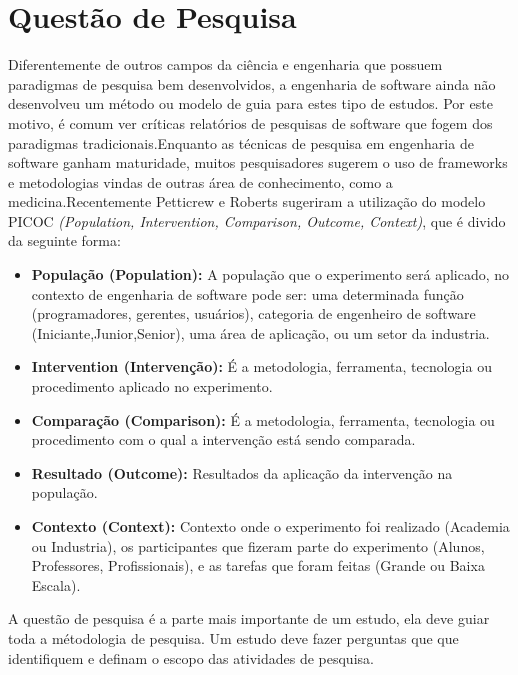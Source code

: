\section{Questão de Pesquisa}

Diferentemente de outros campos da ciência e engenharia que possuem paradigmas de 
pesquisa bem desenvolvidos, a engenharia de software ainda não desenvolveu um
método ou modelo de guia para estes tipo de estudos. Por este motivo, é
comum ver críticas relatórios de pesquisas de software que fogem dos paradigmas
tradicionais\cite{shaw}.Enquanto as técnicas de pesquisa em engenharia de software
ganham maturidade, muitos pesquisadores sugerem o uso de frameworks e metodologias
vindas de outras área de conhecimento, como a medicina\cite{guidelines}.Recentemente 
Petticrew e Roberts sugeriram a utilização do modelo PICOC \textit{(Population,
Intervention, Comparison, Outcome, Context)}, que é divido da seguinte forma\cite{petticrew}:

\begin{itemize}
    \item \textbf{População (Population):} A população que o experimento será 
        aplicado, no contexto de engenharia de software pode ser: uma determinada
        função (programadores, gerentes, usuários), categoria de engenheiro de 
        software (Iniciante,Junior,Senior), uma área de aplicação, ou um setor 
        da industria.
    \item \textbf{Intervention (Intervenção):} É a metodologia, ferramenta,
        tecnologia ou procedimento aplicado no experimento.
    \item \textbf{Comparação (Comparison):} É a metodologia, ferramenta,
        tecnologia ou procedimento com o qual a intervenção está sendo comparada.
    \item \textbf{Resultado  (Outcome):} Resultados da aplicação da intervenção na
        população.
    \item \textbf{Contexto (Context):} Contexto onde o experimento foi realizado
        (Academia ou Industria), os participantes que fizeram parte do experimento
        (Alunos, Professores, Profissionais), e as tarefas que foram feitas
        (Grande ou Baixa Escala).
\end{itemize}

A questão de pesquisa é a parte mais importante de um estudo, ela deve guiar toda
a métodologia de pesquisa. Um estudo deve fazer perguntas que que identifiquem e 
definam o escopo das atividades de pesquisa\cite{guidelines}.

